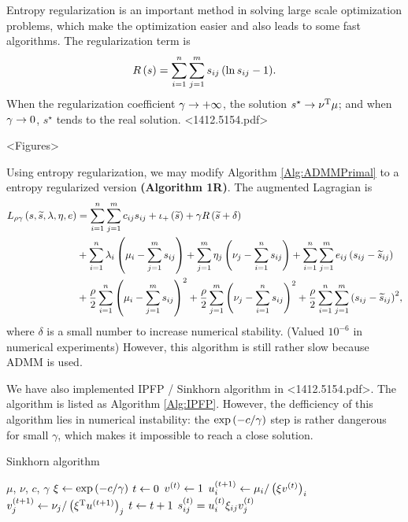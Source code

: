 \documentclass[english]{pkupaper}
\begin{document}
Entropy regularization is an important method in solving large scale optimization problems, which make the optimization easier and also leads to some fast algorithms. The regularization term is
\begin{equation}
R \left( s \right) = \sum_{ {i} = {1} }^{n}{\sum_{ {j} = {1} }^{m}{ s_{ i j } \left(  \ln s_{ i j } - 1  \right) }}.
\end{equation}
When the regularization coefficient $ \gamma \rightarrow +\infty $, the solution $ s^{\star} \rightarrow \nu^{\mathrm{T}} \mu $; and when $ \gamma \rightarrow 0 $, $s^{\star}$ tends to the real solution. <1412.5154.pdf>

<Figures>

Using entropy regularization, we may modify Algorithm \ref{Alg:ADMMPrimal} to a entropy regularized version \textbf{(Algorithm \hypertarget{EAlg:1R}{1R})}. The augmented Lagragian is
\begin{equation}
\begin{aligned}
L_{ \rho \gamma } \left(  s, \widetilde{s}, \lambda, \eta, e  \right) &= \sum_{ {i} = {1} }^{n}{\sum_{ {j} = {1} }^{m}{ c_{ i j } s_{ i j } }} + \iota_+ \left( \widetilde{s} \right) + \gamma R \left(  \widetilde{s} + \delta  \right) \\
&+ \sum_{ {i} = {1} }^{n}{ \lambda_i \left(  \mu_i - \sum_{ {j} = {1} }^{m}{s_{ i j }}  \right) } + \sum_{ {j} = {1} }^{m}{ \eta_j \left(  \nu_j - \sum_{ {i} = {1} }^{n}{s_{ i j }}  \right) } + \sum_{ {i} = {1} }^{n}{\sum_{ {j} = {1} }^{m}{ e_{ i j } \left(  s_{ i j } - \widetilde{s}_{ i j }  \right) }} \\
&+ \frac{\rho}{2} \sum_{ {i} = {1} }^{n}{\left(  \mu_i - \sum_{ {j} = {1} }^{m}{s_{ i j }}  \right)^2} + \frac{\rho}{2} \sum_{ {j} = {1} }^{m}{\left(  \nu_j - \sum_{ {i} = {1} }^{n}{s_{ i j }}  \right)^2} + \frac{\rho}{2} \sum_{ {i} = {1} }^{n}{\sum_{ {j} = {1} }^{m}{\left(  s_{ i j } - \widetilde{s}_{ i j }  \right)^2}}, \\
\end{aligned}
\end{equation}
where $\delta$ is a small number to increase numerical stability. (Valued $10^{-6}$ in numerical experiments) However, this algorithm is still rather slow because ADMM is used.

We have also implemented IPFP / Sinkhorn algorithm in <1412.5154.pdf>. The algorithm is listed as Algorithm \ref{Alg:IPFP}. However, the defficiency of this algorithm lies in numerical instability: the $ \exp \left(  -c / \gamma  \right) $ step is rather dangerous for small $\gamma$, which makes it impossible to reach a close solution.

\begin{algorithm}
\caption{Sinkhorn algorithm}
\label{Alg:IPFP}
\begin{algorithmic}
\REQUIRE $\mu$, $\nu$, $c$, $\gamma$
\STATE $ \xi \leftarrow \exp \left(  -c / \gamma  \right) $
\STATE $ t \leftarrow 0 $
\STATE $ v^{\left( t \right)} \leftarrow 1 $
\STATE $ u^{\left(  t + 1  \right)}_i \leftarrow \mu_i / \left(  \xi v^{\left( t \right)}  \right)_i $
\STATE $ v^{\left(  t + 1  \right)}_j \leftarrow \nu_j / \left(  \xi^{\mathrm{T}} u^{\left(  t + 1  \right)}  \right)_j $
\STATE $ t \leftarrow t + 1 $
\ENDWHILE
$s^{\left( t \right)}_{ i j } = u^{\left( t \right)}_i \xi_{ i j } v^{\left( t \right)}_j $
\end{algorithmic}
\end{algorithm}

	
\end{document}
